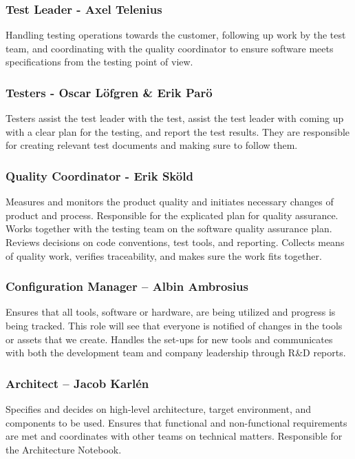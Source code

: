 \subsubsection*{Test Leader - Axel Telenius} 
Handling testing operations towards the customer, following up work by the test team, and coordinating with the quality coordinator to ensure software meets specifications from the testing point of view.

\subsubsection*{Testers - Oscar Löfgren \& Erik Parö}
Testers assist the test leader with the test, assist the test leader with coming up with a clear plan for the testing, and report the test results. They are responsible for creating relevant test documents and making sure to follow them. 

\subsubsection*{Quality Coordinator - Erik Sköld} 
Measures and monitors the product quality and initiates necessary changes of product and process. Responsible for the explicated plan for quality assurance. Works together with the testing team on the software quality assurance plan. Reviews decisions on code conventions, test tools, and reporting. Collects means of quality work, verifies traceability, and makes sure the work fits together. 

\subsubsection*{Configuration Manager – Albin Ambrosius} 
Ensures that all tools, software or hardware, are being utilized and progress is being tracked. This role will see that everyone is notified of changes in the tools or assets that we create.  Handles the set-ups for new tools and communicates with both the development team and company leadership through R\&D reports.  

\subsubsection*{Architect – Jacob Karlén} 
Specifies and decides on high-level architecture, target environment, and components to be used. Ensures that functional and non-functional requirements are met and coordinates with other teams on technical matters. Responsible for the Architecture Notebook.  

